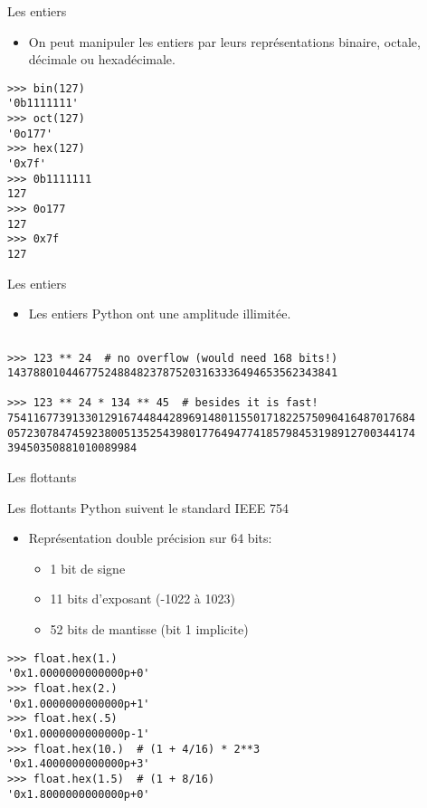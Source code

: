 \documentclass[dvipsnames]{beamer}
\begin{document}
\begin{frame}
    [fragile]{Les entiers}

    \begin{itemize}
        \item On peut manipuler les entiers par leurs représentations binaire,
              octale, décimale ou hexadécimale.
    \end{itemize}

    \begin{verbatim}
>>> bin(127)
'0b1111111'
>>> oct(127)
'0o177'
>>> hex(127)
'0x7f'
>>> 0b1111111
127
>>> 0o177
127
>>> 0x7f
127
\end{verbatim}
\end{frame}

\begin{frame}
    [fragile]{Les entiers}
    \begin{itemize}
        \item Les entiers Python ont une amplitude illimitée.
    \end{itemize}

    \begin{verbatim}

>>> 123 ** 24  # no overflow (would need 168 bits!)
143788010446775248848237875203163336494653562343841

>>> 123 ** 24 * 134 ** 45  # besides it is fast!
754116773913301291674484428969148011550171822575090416487017684
057230784745923800513525439801776494774185798453198912700344174
39450350881010089984
\end{verbatim}
\end{frame}

\begin{frame}
    [fragile]{Les flottants}

    Les flottants Python suivent le standard IEEE 754
    \begin{itemize}
        \item Représentation double précision sur 64 bits:
              \begin{itemize}
                  \item 1 bit de signe
                  \item 11 bits d'exposant (-1022 à 1023)
                  \item 52 bits de mantisse (bit 1 implicite)
              \end{itemize}
    \end{itemize}

    \begin{verbatim}
>>> float.hex(1.)
'0x1.0000000000000p+0'
>>> float.hex(2.)
'0x1.0000000000000p+1'
>>> float.hex(.5)
'0x1.0000000000000p-1'
>>> float.hex(10.)  # (1 + 4/16) * 2**3
'0x1.4000000000000p+3'
>>> float.hex(1.5)  # (1 + 8/16)
'0x1.8000000000000p+0'
\end{verbatim}
\end{frame}
\end{document}
